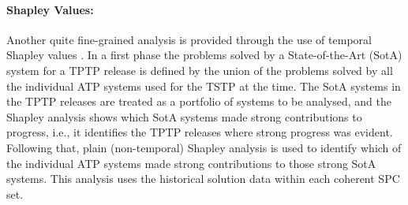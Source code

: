 \documentclass[runningheads]{llncs}
\begin{document}
\paragraph{Shapley Values:}
Another quite fine-grained analysis is provided through the use of temporal Shapley values 
\cite{KF+19}.
In a first phase the problems solved by a State-of-the-Art (SotA) system for a TPTP release is 
defined by the union of the problems solved by all the individual ATP systems used for the TSTP 
at the time.
The SotA systems in the TPTP releases are treated as a portfolio of systems to be analysed, and 
the Shapley analysis shows which SotA systems made strong contributions to progress, i.e., it
identifies the TPTP releases where strong progress was evident.
Following that, plain (non-temporal) Shapley analysis \cite{FK+16} is used to identify which
of the individual ATP systems made strong contributions to those strong SotA systems.
This analysis uses the historical solution data within each coherent SPC set.
\end{document}
